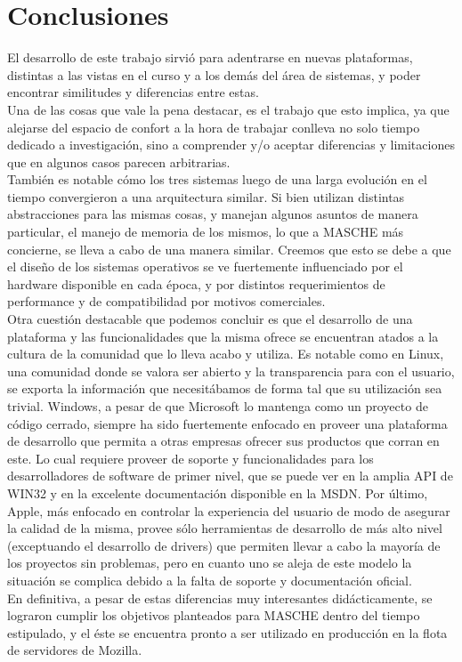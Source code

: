 \section{Conclusiones}

El desarrollo de este trabajo sirvió para adentrarse en nuevas plataformas,
distintas a las vistas en el curso y a los demás del área de sistemas, y poder
encontrar similitudes y diferencias entre estas.\\

Una de las cosas que vale la pena destacar, es el trabajo que esto implica,
ya que alejarse del espacio de confort a la hora de trabajar conlleva no solo
tiempo dedicado a investigación, sino a comprender y/o aceptar diferencias y
limitaciones que en algunos casos parecen arbitrarias.\\

También es notable cómo los tres sistemas luego de una larga evolución en el
tiempo convergieron a una arquitectura similar. Si bien utilizan distintas
abstracciones para las mismas cosas, y manejan algunos asuntos de manera
particular, el manejo de memoria de los mismos, lo que a MASCHE más concierne,
se lleva a cabo de una manera similar. Creemos que esto se debe a que el diseño
de los sistemas operativos se ve fuertemente influenciado por el hardware
disponible en cada época, y por distintos requerimientos de performance y de
compatibilidad por motivos comerciales.\\

Otra cuestión destacable que podemos concluir es que el desarrollo de una
plataforma y las funcionalidades que la misma ofrece se encuentran atados a la
cultura de la comunidad que lo lleva acabo y utiliza. Es notable como en Linux,
una comunidad donde se valora ser abierto y la transparencia para con el
usuario, se exporta la información que necesitábamos de forma tal que su
utilización sea trivial. Windows, a pesar de que Microsoft lo mantenga como un
proyecto de código cerrado, siempre ha sido fuertemente enfocado en proveer una
plataforma de desarrollo que permita a otras empresas ofrecer sus productos que
corran en este. Lo cual requiere proveer de soporte y funcionalidades
para los desarrolladores de software de primer nivel, que se puede ver en
la amplia API de WIN32 y en la excelente documentación disponible en la MSDN.
Por último, Apple, más enfocado en controlar la experiencia del usuario de modo
de asegurar la calidad de la misma, provee sólo herramientas de desarrollo de
más alto nivel (exceptuando el desarrollo de drivers) que permiten llevar a
cabo la mayoría de los proyectos sin problemas, pero en cuanto uno se aleja de
este modelo la situación se complica debido a la falta de soporte y
documentación oficial.\\

En definitiva, a pesar de estas diferencias muy interesantes didácticamente, se
lograron cumplir los objetivos planteados para MASCHE dentro del tiempo
estipulado, y el éste se encuentra pronto a ser utilizado en producción en la
flota de servidores de Mozilla.\\

